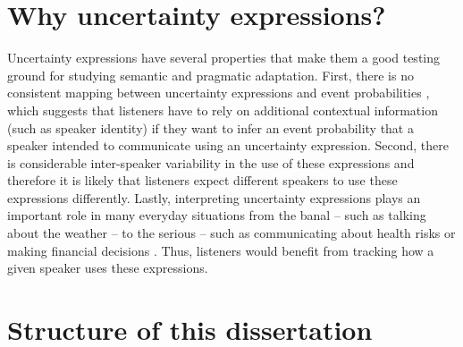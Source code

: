 \section{Why uncertainty expressions?}
\label{sec:why-uncertainty-expressions}

Uncertainty expressions have several properties that make them a good testing ground for studying semantic and pragmatic
adaptation. First, there is no consistent mapping between uncertainty expressions and event probabilities , 
which suggests that listeners have to rely on additional contextual information (such as speaker identity)
if they want to infer an event probability that a speaker intended to communicate using an uncertainty expression. Second, there is considerable inter-speaker variability 
in the use of these expressions \cite{Wallsten1986} and therefore it is likely that listeners expect different speakers to use these expressions
differently. Lastly, interpreting uncertainty expressions plays an important role in many everyday situations from the banal -- 
such as talking about the weather -- to the serious -- such as communicating about health risks 
\cite{Berry2004, Lipkus2007, Politi2007} or making financial decisions \cite{Doupnik2003}. 
Thus, listeners would benefit from tracking  how a given speaker uses these expressions. 

\section{Structure of this dissertation}

